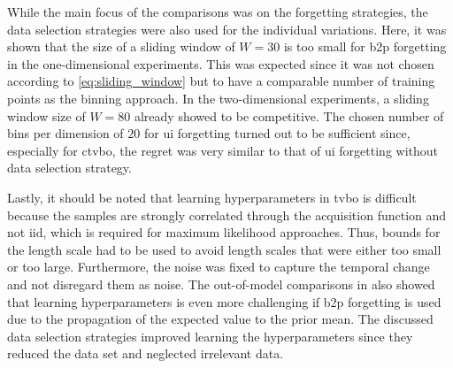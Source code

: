 While the main focus of the comparisons was on the forgetting strategies, the data selection strategies were also used for the individual variations. Here, it was shown that the size of a sliding window of $W=30$ is too small for \gls{b2p} forgetting in the one-dimensional experiments. This was expected since it was not chosen according to \eqref{eq:sliding_window} but to have a comparable number of training points as the binning approach. In the two-dimensional experiments, a sliding window size of $W=80$ already showed to be competitive. The chosen number of bins per dimension of $20$ for \gls{ui} forgetting turned out to be sufficient since, especially for \gls{ctvbo}, the regret was very similar to that of \gls{ui} forgetting without data selection strategy.

Lastly, it should be noted that learning hyperparameters in \gls{tvbo} is difficult because the samples are strongly correlated through the acquisition function and not iid, which is required for maximum likelihood approaches. Thus, bounds for the length scale had to be used to avoid length scales that were either too small or too large. Furthermore, the noise was fixed to capture the temporal change and not disregard them as noise.
The out-of-model comparisons in  also showed that learning hyperparameters is even more challenging if \gls{b2p} forgetting is used due to the propagation of the expected value to the prior mean. The discussed data selection strategies improved learning the hyperparameters since they reduced the data set and neglected irrelevant data.

